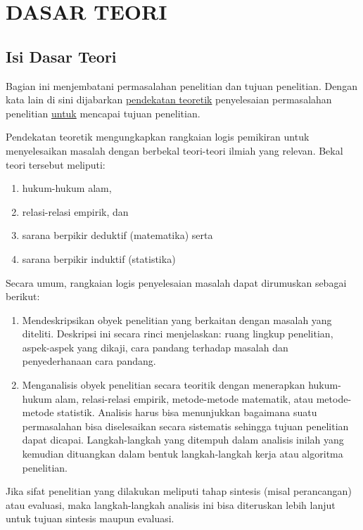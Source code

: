 \chapter{DASAR TEORI}
\label{dasar-teori}


\section{Isi Dasar Teori}
Bagian ini menjembatani permasalahan penelitian dan tujuan penelitian. Dengan kata lain di sini dijabarkan \underline{pendekatan teoretik} penyelesaian permasalahan penelitian \underline{untuk} mencapai tujuan penelitian. 

Pendekatan teoretik mengungkapkan rangkaian logis pemikiran untuk menyelesaikan masalah dengan berbekal teori-teori ilmiah yang relevan. Bekal teori tersebut meliputi:
\begin{enumerate}
    \item hukum-hukum alam,
    \item relasi-relasi empirik, dan
    \item sarana berpikir deduktif (matematika) serta
    \item sarana berpikir induktif (statistika)
\end{enumerate}

Secara umum, rangkaian logis penyelesaian masalah dapat dirumuskan sebagai berikut:
\begin{enumerate}
    \item Mendeskripsikan obyek penelitian yang berkaitan dengan masalah yang diteliti. Deskripsi ini secara rinci menjelaskan: ruang lingkup penelitian, aspek-aspek yang dikaji, cara pandang terhadap masalah dan penyederhanaan cara pandang.
    \item Menganalisis obyek penelitian secara teoritik dengan menerapkan hukum-hukum alam, relasi-relasi empirik, metode-metode matematik, atau metode-metode statistik. Analisis harus bisa menunjukkan bagaimana suatu permasalahan bisa diselesaikan secara sistematis sehingga tujuan penelitian dapat dicapai. Langkah-langkah yang ditempuh dalam analisis inilah yang kemudian dituangkan dalam bentuk langkah-langkah kerja atau algoritma penelitian.
\end{enumerate}

Jika sifat penelitian yang dilakukan meliputi tahap sintesis (misal perancangan) atau evaluasi, maka langkah-langkah analisis ini bisa diteruskan lebih lanjut untuk tujuan sintesis maupun evaluasi.

